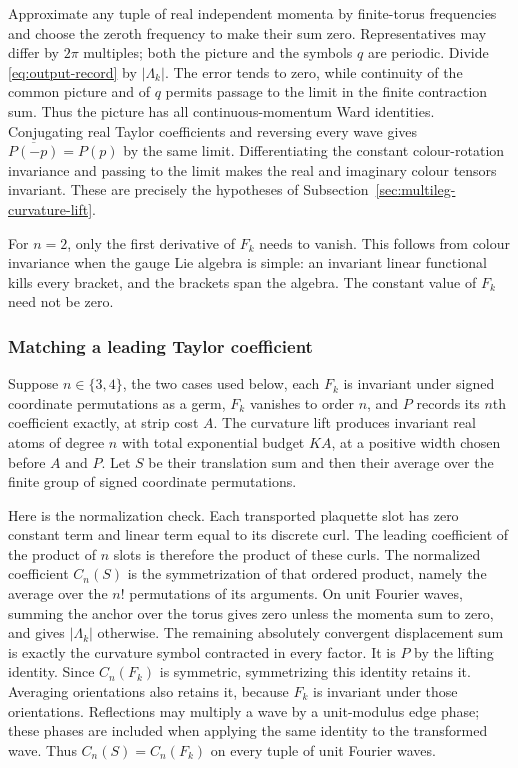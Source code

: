 Approximate any tuple of real independent momenta by finite-torus
frequencies and choose the zeroth frequency to make their sum
zero. Representatives may differ by $2\pi$ multiples; both the
picture and the symbols $q$ are periodic. Divide
\eqref{eq:output-record} by $|\Lambda_k|$. The error tends to
zero, while continuity of the common picture and of $q$ permits
passage to the limit in the finite contraction sum. Thus the
picture has all continuous-momentum Ward identities. Conjugating
real Taylor coefficients and reversing every wave gives
$\overline{P(-p)}=P(p)$ by the same limit. Differentiating the
constant colour-rotation invariance and passing to the limit
makes the real and imaginary colour tensors invariant. These
are precisely the hypotheses of
Subsection~\ref{sec:multileg-curvature-lift}.

For $n=2$, only the first derivative of $F_k$ needs to vanish.
This follows from colour invariance when the gauge Lie algebra is
simple: an invariant linear functional kills every bracket, and
the brackets span the algebra. The constant value of $F_k$ need
not be zero.

\subsubsection{Matching a leading Taylor coefficient}
Suppose $n\in\{3,4\}$, the two cases used below, each $F_k$ is
invariant under signed coordinate permutations as a germ, $F_k$ vanishes to order $n$, and $P$ records its
$n$th coefficient exactly, at strip cost $A$. The curvature lift
produces invariant real atoms of degree $n$ with total exponential
budget $KA$, at a positive width chosen before $A$ and $P$.
Let $S$ be their translation sum and then their average over the
finite group of signed coordinate permutations.

Here is the normalization check. Each transported plaquette slot
has zero constant term and linear term equal to its discrete curl.
The leading coefficient of the product of $n$ slots is therefore
the product of these curls. The normalized coefficient $C_n(S)$
is the symmetrization of that ordered product, namely the average
over the $n!$ permutations of its arguments. On unit Fourier
waves, summing the anchor over the torus gives zero unless the
momenta sum to zero, and gives $|\Lambda_k|$ otherwise. The
remaining absolutely convergent displacement sum is exactly the
curvature symbol contracted in every factor. It is $P$ by the
lifting identity. Since $C_n(F_k)$ is symmetric, symmetrizing this
identity retains it. Averaging orientations also retains it,
because $F_k$ is invariant under those orientations. Reflections
may multiply a wave by a unit-modulus edge phase; these phases
are included when applying the same identity to the transformed
wave. Thus $C_n(S)=C_n(F_k)$ on every tuple of unit Fourier waves.

